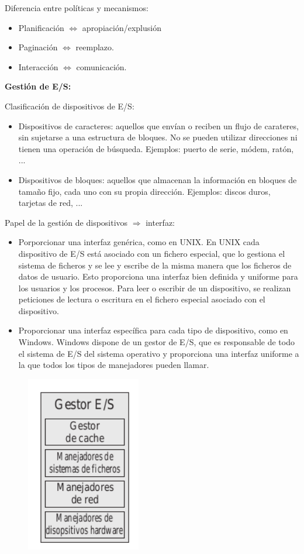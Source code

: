 \documentclass{article}
\begin{document}
Diferencia entre políticas y mecanismos:
\begin{itemize}
\item Planificación $\Leftrightarrow$ apropiación/explusión

\item Paginación $\Leftrightarrow$ reemplazo.

\item Interacción $\Leftrightarrow$ comunicación.
\end{itemize}

\textbf{Gestión de E/S:}

Clasificación de dispositivos de E/S:
\begin{itemize}
\item Dispositivos de caracteres: aquellos que envían o reciben un flujo de carateres, sin sujetarse a una estructura de bloques. No se pueden utilizar direcciones ni tienen una operación de búsqueda. Ejemplos: puerto de serie, módem, ratón, ...

\item Dispositivos de bloques: aquellos que almacenan la información en bloques de tamaño fijo, cada uno con su propia dirección. Ejemplos: discos duros, tarjetas de red, ...
\end{itemize}

Papel de la gestión de dispositivos $\Rightarrow$ interfaz:
\begin{itemize}
\item Porporcionar una interfaz genérica, como en UNIX. En UNIX cada dispositivo de E/S está asociado con un fichero especial, que lo gestiona el sistema de ficheros y se lee y escribe de la misma manera que los ficheros de datos de usuario. Esto proporciona una interfaz bien definida y uniforme para los usuarios y los procesos. Para leer o escribir de un dispositivo, se realizan peticiones de lectura o escritura en el fichero especial asociado con el dispositivo.

\item Proporcionar una interfaz específica para cada tipo de dispositivo, como en Windows. Windows dispone de un gestor de E/S, que es responsable de todo el sistema de E/S del sistema operativo y proporciona una interfaz uniforme a la que todos los tipos de manejadores pueden llamar. 
\end{itemize}

\begin{figure}[h]
\centering
\includegraphics[scale=1,width=50mm]{ES_windows.png}
\end{figure}
\end{document}
